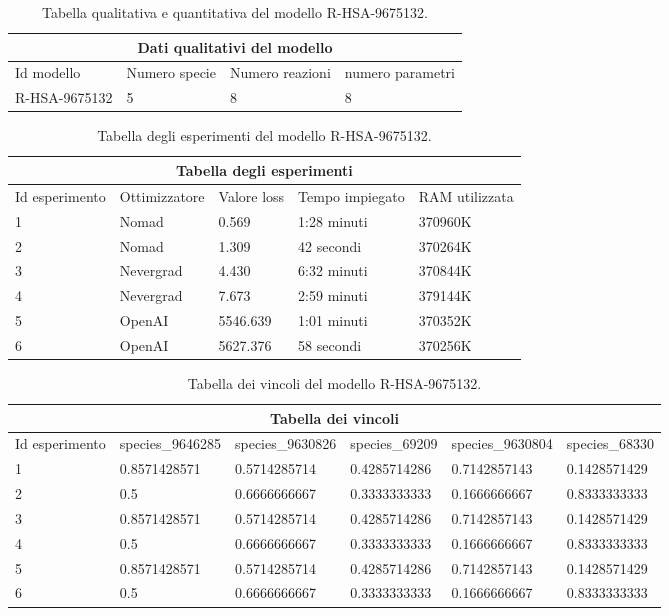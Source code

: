 \begin{table}
\centering
\begin{tabular}{ |p{3cm}||p{3cm}|p{3cm}|p{3cm}|  }
 \hline
 \multicolumn{4}{|c|}{Dati qualitativi del modello} \\
 \hline
 Id modello& Numero specie &Numero reazioni&numero parametri\\
 \hline
 R-HSA-9675132   & 5    &8&   8\\
 \hline
\end{tabular}
\caption{Tabella qualitativa e quantitativa del modello R-HSA-9675132.}
\label{table:qual-R-HSA-9675132}
\end{table}

\begin{table}
\centering
\begin{tabular}{ |p{2cm}||p{2.5cm}|p{2cm}|p{2cm}|p{2cm}|  }
 \hline
 \multicolumn{5}{|c|}{Tabella degli esperimenti} \\
 \hline
 Id esperimento&Ottimizzatore&Valore loss  &Tempo impiegato&RAM utilizzata\\
 \hline
 1 & Nomad & 0.569& 1:28 minuti & 370960K\\
 \hline
 2 & Nomad & 1.309  & 42 secondi & 370264K\\
 \hline
 3 & Nevergrad & 4.430  & 6:32 minuti & 370844K\\
 \hline
 4 & Nevergrad & 7.673 &2:59 minuti &379144K\\
 \hline
 5 & OpenAI & 5546.639  & 1:01 minuti & 370352K\\
 \hline 
 6 & OpenAI & 5627.376  & 58 secondi & 370256K\\
 \hline
\end{tabular}
\caption{Tabella degli esperimenti del modello R-HSA-9675132.}
\label{table:es-R-HSA-9675132}
\end{table}

\begin{table}
\centering
\begin{tabular}{ |p{2cm}||p{2.5cm}|p{2.5cm}|p{2.5cm}|p{2.5cm}|p{2.5cm}|}
 \hline
 \multicolumn{6}{|c|}{Tabella dei vincoli} \\
 \hline
Id esperimento & species\_9646285 & species\_9630826 & species\_69209 & species\_9630804 & species\_68330 \\
\hline
1 & 0.8571428571 & 0.5714285714 & 0.4285714286 & 0.7142857143 & 0.1428571429  \\
\hline
2 & 0.5 & 0.6666666667 & 0.3333333333 & 0.1666666667 & 0.8333333333 \\
\hline
3 & 0.8571428571 & 0.5714285714 & 0.4285714286 & 0.7142857143 & 0.1428571429  \\
\hline
4 & 0.5 & 0.6666666667 & 0.3333333333 & 0.1666666667 & 0.8333333333 \\
\hline
5 & 0.8571428571 & 0.5714285714 & 0.4285714286 & 0.7142857143 & 0.1428571429  \\
\hline
6 & 0.5 & 0.6666666667 & 0.3333333333 & 0.1666666667 & 0.8333333333 \\
\hline
\end{tabular}
\caption{Tabella dei vincoli del modello R-HSA-9675132.}
\label{table:vin-R-HSA-9675132}
\end{table}

